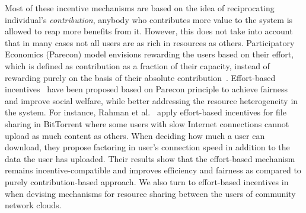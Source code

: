 Most of these incentive mechanisms are based on the idea of reciprocating individual's \emph{contribution}, 
anybody who contributes more value to the system is allowed to reap more benefits from it.
However, this does not take into account that in many cases not all users are as rich in resources as others. 
Participatory Economics (Parecon) model envisions rewarding the users 
based on their effort, which is defined as contribution as a fraction of their capacity, 
instead of rewarding purely on the basis of their absolute contribution~\cite{Albert2004Parecon}. 
Effort-based incentives~\cite{Rahman2010, Vega2013Sharing, Vega2015Thesis} 
have been proposed based on Parecon principle to achieve fairness and 
improve social welfare, while better addressing the resource heterogeneity in the system. 
For instance, Rahman et al.~\cite{Rahman2010} apply effort-based incentives for file sharing in BitTorrent 
where some users with slow Internet connections cannot upload as much content as others. 
When deciding how much a user can download, they propose factoring in user's connection speed 
in addition to the data the user has uploaded.
Their results show that the effort-based mechanism remains incentive-compatible 
and improves efficiency and fairness as compared to purely contribution-based approach.
We also turn to effort-based incentives in  
when devising mechanisms for resource sharing between the users of community network clouds.

